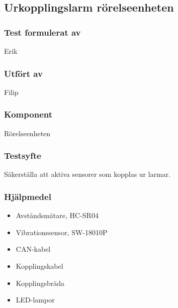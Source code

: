 \clearpage
\subsection{Urkopplingslarm rörelseenheten}
\label{test:UrkopplingMotion}

\setlength{\columnsep}{1cm}




\begin{multicols}{2}
\subsubsection*{Test formulerat av}
Erik

\subsubsection*{Utfört av}
Filip


\end{multicols}
\subsubsection*{Komponent}
Rörelseenheten


\subsubsection*{Testsyfte}
Säkerställa att aktiva sensorer som kopplas ur larmar.

\subsubsection*{Hjälpmedel}
\begin{itemize}
	\item Avståndsmätare, HC-SR04
	\item Vibrationssensor, SW-18010P
	\item CAN-kabel
	\item Kopplingskabel
	\item Kopplingsbräda
	\item LED-lampor
\end{itemize}



